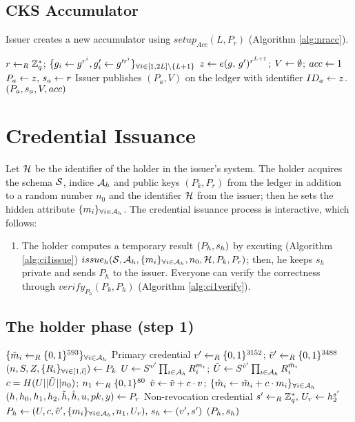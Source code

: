 \documentclass{article}
\begin{document}
\subsection{CKS Accumulator}
Issuer creates a new accumulator using $setup_{Acc}(L, P_{r})$ (Algorithm \ref{alg:nracc}).
\begin{algorithm}
\caption{$setup_{Acc}(L, P_{r})$}
\label{alg:nracc}
\begin{algorithmic}
	\State $r\leftarrow _{R} \mathbb{Z}_{q}^{*}$; $\{g_{i}\leftarrow g^{r^{i}}, g'_{i}\leftarrow g'^{r^{i}}\}_{\forall i\in [1, 2L] \backslash \{L + 1\}}$
	\State $z\leftarrow e(g\mbox{, }g')^{r^{L + 1}}$; $V\leftarrow \emptyset$; $acc\leftarrow 1$
	\State $P_{a}\leftarrow {z}\mbox{, }s_{a}\leftarrow {r}$
	\State \Comment Issuer publishes $(P_{a}, V)$ on the ledger with identifier $ID_{a} \leftarrow z$.
	\State \Return $(P_{a}, s_{a}, V, acc)$
\end{algorithmic}
\end{algorithm}


\clearpage
\section{Credential Issuance}
Let $\mathcal{H}$ be the identifier of the holder in the issuer's system. The holder acquires the schema $\mathcal{S}$, indice $\mathcal{A}_{h}$ and public keys $(P_{k}, P_{r})$ from the ledger in addition to a random number $n_0$ and the identifier $\mathcal{H}$ from the issuer; then he sets the hidden attribute $\{m_i\}_{\forall i\in \mathcal{A}_{h}}$. The credential issuance process is interactive, which follows: 
\begin{enumerate}
	\item The holder computes a temporary result $(P_{h}, s_{h})$ by excuting (Algorithm \ref{alg:ci1issue}) $\issuehp$; then, he keeps $s_{h}$ private and sends $P_{h}$ to the issuer. Everyone can verify the correctness through $verify_{P_{h}}(P_{k}, P_{h})$ (Algorithm \ref{alg:ci1verify}).
\end{enumerate}
\subsection{The holder phase (step 1)}

\begin{algorithm}
\caption{$\issuehp$}
\label{alg:ci1issue}
\begin{algorithmic}
	\State $\{\tilde{m}_i\leftarrow _{R} \{0, 1\}^{593}\}_{\forall i\in \mathcal{A}_{h}}$
	\Comment Primary credential
	\State $v'\leftarrow _{R} \{0, 1\}^{3152}$; $\tilde{v}'\leftarrow _{R} \{0, 1\}^{3488}$
	\State $(n, S, Z, \{R_i\}_{\forall i\in [1,l]}) \leftarrow P_{k}$
	\State $U\leftarrow S^{v'}\prod _{i\in \mathcal{A}_{h}}R_{i}^{m_{i}}$; $\tilde{U}\leftarrow S^{\tilde{v}'}\prod _{i\in \mathcal{A}_{h}}R_{i}^{\tilde{m}_{i}}$
	\State $c = H(U||\tilde{U}||n_{0})$; $n_1\leftarrow _{R} \{0, 1\}^{80}$
	\State $\hat{v}_{}\leftarrow \tilde{v}_{} + c\cdot v_{}$; $\{\hat{m}_{i}\leftarrow \tilde{m}_{i} + c\cdot m_{i}\}_{\forall i\in \mathcal{A}_{h}}$
	\State $(h, h_0, h_1, h_2, \tilde{h}, \hat{h}, u, pk, y) \leftarrow P_{r}$
	\Comment Non-revocation credential
	\State $s'\leftarrow _{R} \mathbb{Z}_{q}^{*}\mbox{, }U_{r}\leftarrow h_{2}^{s'}$
	\State $P_{h}\leftarrow {(U, c, \hat{v}', \{m_{i}\}_{\forall i\in \mathcal{A}_{h}},n_{1}, U_{r})}\mbox{, }s_{h}\leftarrow {(v',s')}$
	\State \Return $(P_{h}, s_{h})$
\end{algorithmic}
\end{algorithm}
\end{document}
